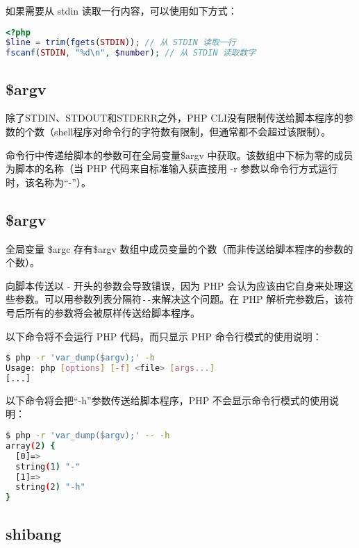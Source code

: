 如果需要从 stdin 读取一行内容，可以使用如下方式：

\begin{lstlisting}[language=PHP]
<?php
$line = trim(fgets(STDIN)); // 从 STDIN 读取一行
fscanf(STDIN, "%d\n", $number); // 从 STDIN 读取数字
\end{lstlisting}


\subsection{\$argv}

除了STDIN、STDOUT和STDERR之外，PHP CLI没有限制传送给脚本程序的参数的个数（shell程序对命令行的字符数有限制，但通常都不会超过该限制）。

命令行中传递给脚本的参数可在全局变量\$argv 中获取。该数组中下标为零的成员为脚本的名称（当 PHP 代码来自标准输入获直接用 -r 参数以命令行方式运行时，该名称为“-”）。


\subsection{\$argv}

全局变量 \$argc 存有\$argv 数组中成员变量的个数（而非传送给脚本程序的参数的个数）。



向脚本传送以 - 开头的参数会导致错误，因为 PHP 会认为应该由它自身来处理这些参数。可以用参数列表分隔符\texttt{-\/-}来解决这个问题。在 PHP 解析完参数后，该符号后所有的参数将会被原样传送给脚本程序。


\begin{compactitem}
\item 以下命令将不会运行 PHP 代码，而只显示 PHP 命令行模式的使用说明：

\begin{lstlisting}[language=bash]
$ php -r 'var_dump($argv);' -h
Usage: php [options] [-f] <file> [args...]
[...]
\end{lstlisting}

\item 以下命令将会把“-h”参数传送给脚本程序，PHP 不会显示命令行模式的使用说明：

\begin{lstlisting}[language=bash]
$ php -r 'var_dump($argv);' -- -h
array(2) {
  [0]=>
  string(1) "-"
  [1]=>
  string(2) "-h"
}
\end{lstlisting}
\end{compactitem}

\subsection{shibang}

